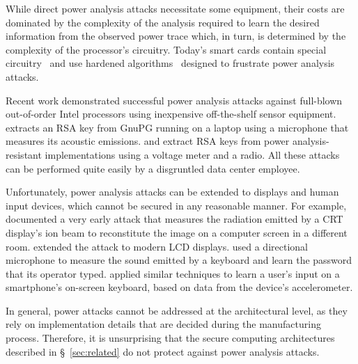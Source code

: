 While direct power analysis attacks necessitate some equipment, their costs are
dominated by the complexity of the analysis required to learn the desired
information from the observed power trace which, in turn, is determined by the
complexity of the processor's circuitry. Today's smart cards contain special
circuitry~\cite{tiri2002dcmos} and use hardened algorithms~\cite{herbst2006aes}
designed to frustrate power analysis attacks.

Recent work demonstrated successful power analysis attacks against full-blown
out-of-order Intel processors using inexpensive off-the-shelf sensor equipment.
\cite{genkin2014rsa} extracts an RSA key from GnuPG running on a laptop using a
microphone that measures its acoustic emissions. \cite{genkin2014fullpa} and
\cite{genkin2015radiopa} extract RSA keys from power analysis-resistant
implementations using a voltage meter and a radio. All these attacks can be
performed quite easily by a disgruntled data center employee.

Unfortunately, power analysis attacks can be extended to displays and human
input devices, which cannot be secured in any reasonable manner. For example,
\cite{van1985monitorpa} documented a very early attack that measures the
radiation emitted by a CRT display's ion beam to reconstitute the image on a
computer screen in a different room. \cite{kuhn2005lcdpa} extended the attack
to modern LCD displays. \cite{zhuang2009keyboard} used a directional microphone
to measure the sound emitted by a keyboard and learn the password that its
operator typed. \cite{owusu2012accessory} applied similar techniques to learn a
user's input on a smartphone's on-screen keyboard, based on data from the
device's accelerometer.

In general, power attacks cannot be addressed at the architectural level, as
they rely on implementation details that are decided during the manufacturing
process. Therefore, it is unsurprising that the secure computing architectures
described in \S~\ref{sec:related} do not protect against power analysis
attacks.
